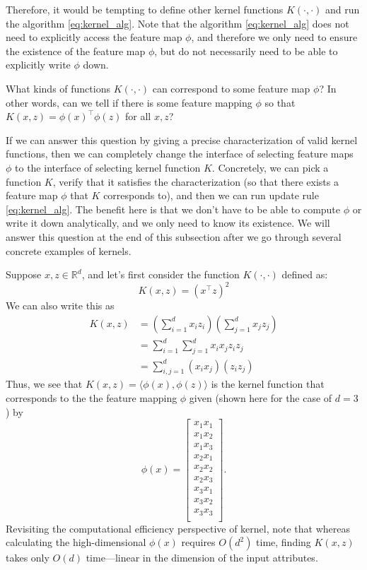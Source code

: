 Therefore, it would be tempting to define other kernel functions $K(\cdot,\cdot)$ %
and run the algorithm \ref{eq:kernel_alg}. Note that the algorithm \ref{eq:kernel_alg} does not need to
explicitly access the feature map $\phi$, and therefore we only need to ensure the
existence of the feature map $\phi$, but do not necessarily need to be able to
explicitly write $\phi$ down.

What kinds of functions $K(\cdot,\cdot)$ can correspond to some feature map $\phi$? In
other words, can we tell if there is some feature mapping $\phi$ so that $K(x,z) =
\phi(x)^\top \phi(z)$ for all $x,z$?

If we can answer this question by giving a precise characterization of valid
kernel functions, then we can completely change the interface of selecting
feature maps $\phi$ to the interface of selecting kernel function $K$. Concretely,
we can pick a function $K$, verify that it satisfies the characterization (so
that there exists a feature map $\phi$ that $K$ corresponds to), and then we can
run update rule \ref{eq:kernel_alg}. The benefit here is that we don't have to be able
to compute $\phi$ or write it down analytically, and we only need to know its
existence. We will answer this question at the end of this subsection after
we go through several concrete examples of kernels.

Suppose $x,z \in \mathbb{R}^d$, and let's first consider the function $K(\cdot,\cdot)$ defined as:
\begin{equation*}
    K(x,z) = (x^\top z)^2
\end{equation*}
We can also write this as
\begin{align*}
    K(x,z) &= \left( \sum_{i=1}^d x_i z_i \right) \left( \sum_{j=1}^d x_j z_j \right)\\
    &= \sum_{i=1}^d \sum_{j=1}^d x_i x_j z_i z_j\\
    &= \sum_{i,j=1}^d (x_i x_j)(z_i z_j)
\end{align*}
Thus, we see that $K(x,z) = \langle\phi(x),\phi(z)\rangle$ is the kernel function that corresponds
to the the feature mapping $\phi$ given (shown here for the case of $d = 3$) by
\begin{equation*}
    \phi(x) = \begin{bmatrix}
    x_1 x_1\\
    x_1 x_2\\
    x_1 x_3\\
    x_2 x_1\\
    x_2 x_2\\
    x_2 x_3\\
    x_3 x_1\\
    x_3 x_2\\
    x_3 x_3\\
    \end{bmatrix}.
\end{equation*}
Revisiting the computational efficiency perspective of kernel, note that whereas
calculating the high-dimensional $\phi(x)$ requires $O(d^2)$ time, finding $K(x,z)$
takes only $O(d)$ time---linear in the dimension of the input attributes.

